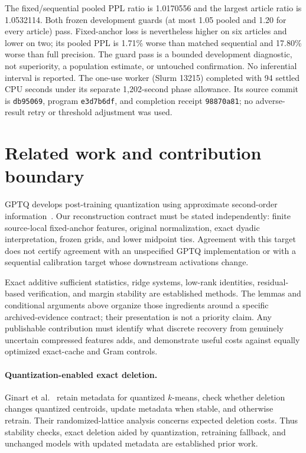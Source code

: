 \documentclass[10pt,twocolumn,letterpaper]{article}
\begin{document}
The fixed/sequential pooled PPL ratio is 1.0170556 and the largest article ratio
is 1.0532114. Both frozen development guards (at most 1.05 pooled and 1.20 for
every article) pass. Fixed-anchor loss is nevertheless higher on six articles
and lower on two; its pooled PPL is 1.71\% worse than matched sequential and
17.80\% worse than full precision. The guard pass is a bounded development
diagnostic, not superiority, a population estimate, or untouched confirmation.
No inferential interval is reported. The one-use worker (Slurm 13215) completed
with 94 settled CPU seconds under its separate 1,202-second phase allowance.
Its source commit is \texttt{db95069}, program \texttt{e3d7b6df}, and completion
receipt \texttt{98870a81}; no adverse-result retry or threshold adjustment was
used.

\section{Related work and contribution boundary}
GPTQ develops post-training quantization using approximate second-order
information~\cite{gptq}. Our reconstruction contract must be stated independently:
finite source-local fixed-anchor features, original normalization, exact dyadic
interpretation, frozen grids, and lower midpoint ties. Agreement with this target
does not certify agreement with an unspecified GPTQ implementation or with a
sequential calibration target whose downstream activations change.

Exact additive sufficient statistics, ridge systems, low-rank identities,
residual-based verification, and margin stability are established methods. The
lemmas and conditional arguments above organize those ingredients around a
specific archived-evidence contract; their presentation is not a priority claim.
Any publishable contribution must identify what discrete recovery from genuinely
uncertain compressed features adds, and demonstrate useful costs against equally
optimized exact-cache and Gram controls.

\paragraph{Quantization-enabled exact deletion.}
Ginart et al.~\cite{ginart} retain metadata for quantized $k$-means, check whether
deletion changes quantized centroids, update metadata when stable, and otherwise
retrain. Their randomized-lattice analysis concerns expected deletion costs.
Thus stability checks, exact deletion aided by quantization, retraining fallback,
and unchanged models with updated metadata are established prior work.
\end{document}

